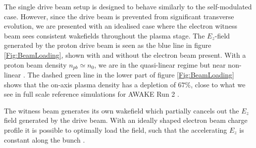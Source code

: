 \documentclass[aps,prstab,reprint,amsmath,amssymb,groupedaddress]{revtex4-1}
\begin{document}

The single drive beam setup is designed to behave similarly to the self-modulated case. However, since the drive beam is
prevented from significant transverse evolution, we are presented with an idealised case where the electron witness beam
sees consistent wakefields throughout the plasma stage. The $E_{z}$-field generated by the proton drive beam is seen as
the blue line in figure \ref{Fig:BeamLoading}, shown with and without the electron beam present. With a proton beam
density $n_{pb} \simeq n_{0}$, we are in the quasi-linear regime but near non-linear \cite{rosenzweig:2010}. The dashed
green line in the lower part of figure \ref{Fig:BeamLoading} shows that the on-axis plasma density has a depletion of
$67\%$, close to what we see in full scale reference simulations for AWAKE Run 2 \cite{awake_collaboration:2016}.



The witness beam generates its own wakefield which partially cancels out the $E_{z}$ field generated by the drive beam.
With an ideally shaped electron beam charge profile it is possible to optimally load the field, such that the
accelerating $E_{z}$ is constant along the bunch \cite{katsouleas:1987, tzoufras:2009}.

\end{document}
